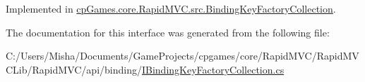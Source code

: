 Implemented in \mbox{\hyperlink{classcp_games_1_1core_1_1_rapid_m_v_c_1_1src_1_1_binding_key_factory_collection_a75cdf372ae3c4f07c7b1caa86ed67425}{cp\+Games.\+core.\+Rapid\+M\+V\+C.\+src.\+Binding\+Key\+Factory\+Collection}}.



The documentation for this interface was generated from the following file\+:\begin{DoxyCompactItemize}
\item 
C\+:/\+Users/\+Misha/\+Documents/\+Game\+Projects/cpgames/core/\+Rapid\+M\+V\+C/\+Rapid\+M\+V\+C\+Lib/\+Rapid\+M\+V\+C/api/binding/\mbox{\hyperlink{_i_binding_key_factory_collection_8cs}{I\+Binding\+Key\+Factory\+Collection.\+cs}}\end{DoxyCompactItemize}
